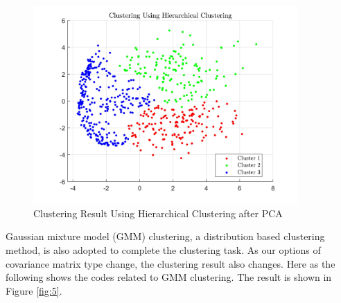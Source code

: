 \documentclass[a4paper,12pt]{article} %
\begin{document}
\begin{figure}[!htbp]
	\centering
	\includegraphics[width=0.9\textwidth]{HIERACHICAL.jpg}
	\caption{Clustering Result Using Hierarchical Clustering after PCA}
	\label{fig:4}
\end{figure}

\hspace{0.7cm}
Gaussian mixture model (GMM) clustering, a distribution based clustering method, is also adopted to complete the clustering task. As our options of covariance matrix type change, the clustering result also changes. Here as the following shows the codes related to GMM clustering. The result is shown in Figure \ref{fig:5}.
\end{document}
